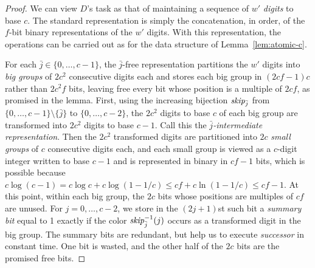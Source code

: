 \documentclass[envcountsame,envcountsect,undated,nolinenumbers]{lnthi}
\def\Tvn#1{\hbox{\textit{#1\/}}}
\def\jj{{\bar j}}
\begin{document}
\begin{proof}
We can view $D$'s task as that of maintaining a
sequence of $w'$ \emph{digits} to base $c$.
The standard representation is simply the concatenation,
in order, of the $f$-bit binary representations of the 
$w'$ digits.
With this representation,
the operations can be carried out as for the
data structure of Lemma~\ref{lem:atomic-c}.

For each $\jj\in\{0,\ldots,c-1\}$, the
$\jj$-free representation partitions the $w'$ digits
into \emph{big groups}
of $2 c^2$ consecutive digits each and stores
each big group in $(2 c f-1)c$ rather
than $2 c^2 f$ bits, leaving free every bit whose
position is a multiple of $2 c f$,
as promised in the lemma.
First, using the increasing bijection
$\Tvn{skip}_\jj$ from $\{0,\ldots,c-1\}\setminus\{\jj\}$
to $\{0,\ldots,c-2\}$, the $2 c^2$ digits
to base $c$ of each big group are
transformed into $2 c^2$ digits to base $c-1$.
Call this the \emph{$\jj$-intermediate representation}.
Then the $2 c^2$ transformed digits are partitioned
into $2 c$ \emph{small groups} of $c$ consecutive digits each,
and each small group is viewed as a $c$-digit integer
written to base $c-1$ and is represented in binary
in $c f-1$ bits, which is possible because
$c\log(c-1)=c\log c+c\log(1-{1/c})
\le c f+c\ln(1-{1/c})\le c f-1$.
At this point, within each big group, the $2 c$ bits whose
positions are multiples of $c f$ are unused.
For $j=0,\ldots,c-2$, we store in the $(2 j+1)$st
such bit a \emph{summary bit} equal to 1 exactly if
the color $\Tvn{skip}^{-1}_{\jj}(j)$
occurs as a transformed digit in the big group.
The summary bits are redundant, but help us to
execute \Tvn{successor} in constant time.
One bit is wasted, and
the other half of the
$2 c$ bits are the promised free bits.


\end{proof}
\end{document}
